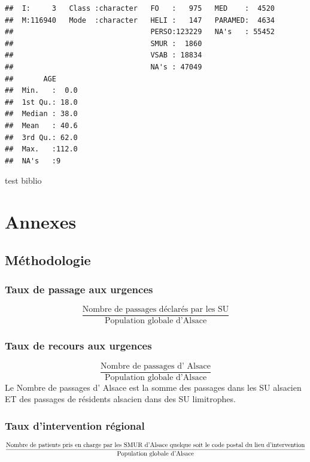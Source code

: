 \documentclass[12pt,english,french,twoside]{report}\usepackage[]{graphicx}\usepackage[]{color}
\makeatletter
\newenvironment{kframe}{%
 \def\at@end@of@kframe{}%
 \ifinner\ifhmode%
  \def\at@end@of@kframe{\end{minipage}}%
  \begin{minipage}{\columnwidth}%
 \fi\fi%
 \def\FrameCommand##1{\hskip\@totalleftmargin \hskip-\fboxsep
 \colorbox{shadecolor}{##1}\hskip-\fboxsep
     \hskip-\linewidth \hskip-\@totalleftmargin \hskip\columnwidth}%
 \MakeFramed {\advance\hsize-\width
   \@totalleftmargin\z@ \linewidth\hsize
   \@setminipage}}%
 {\par\unskip\endMakeFramed%
 \at@end@of@kframe}
\newenvironment{knitrout}{}{} %
\makeatother
\begin{document}
\begin{knitrout}
\begin{kframe}
\begin{verbatim}
##  I:     3   Class :character   FO   :   975   MED    :  4520  
##  M:116940   Mode  :character   HELI :   147   PARAMED:  4634  
##                                PERSO:123229   NA's   : 55452  
##                                SMUR :  1860                   
##                                VSAB : 18834                   
##                                NA's : 47049                   
##       AGE       
##  Min.   :  0.0  
##  1st Qu.: 18.0  
##  Median : 38.0  
##  Mean   : 40.6  
##  3rd Qu.: 62.0  
##  Max.   :112.0  
##  NA's   :9
\end{verbatim}
\end{kframe}
\end{knitrout}


test biblio \cite{1}
\part{Annexes}
\appendix
\chapter{Méthodologie}


\section*{Taux de passage aux urgences}
  \begin{displaymath}
    \frac{\text{Nombre de passages déclarés par les SU}}{\text{Population globale d'Alsace}}
  \end{displaymath}

\section*{Taux de recours aux urgences}
\begin{displaymath}
    \frac{\text{Nombre de passages d' Alsace}}{\text{Population globale d'Alsace}}
  \end{displaymath}
Le Nombre de passages d' Alsace est la somme des passages dans les SU alsacien ET des passages de résidents alsacien dans des SU limitrophes.

\section*{Taux d'intervention régional}
\begin{displaymath}
    \frac{\text{Nombre de patients pris en charge par les SMUR d'Alsace}\linebreak[4] \text{ quelque soit le code postal du lieu d'intervention}}{\text{Population globale d'Alsace}}
  \end{displaymath}
\end{document}

